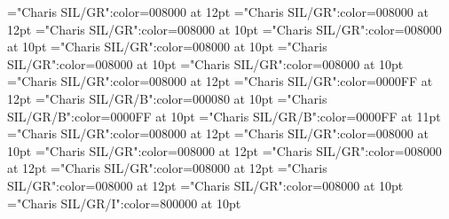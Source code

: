 \documentclass[a4paper,twoside]{article}
\begin{document}
\font\translationcontenttranslationcontentsexamplescontentexamplescontentssensesensecontentsensesentryletDatadicBody="Charis SIL/GR":color=008000 at 12pt
\font\translationtranslationcontenttranslationcontentsexamplescontentexamplescontentssensesensecontentsensesentryletDatadicBody="Charis SIL/GR":color=008000 at 12pt
\font\spanestranslationtranslationcontenttranslationcontentsexamplescontentexamplescontentssensesensecontentsensesentryletDatadicBody="Charis SIL/GR":color=008000 at 10pt
\font\spanspanestranslationtranslationcontenttranslationcontentsexamplescontentexamplescontentssensesensecontentsensesentryletDatadicBody="Charis SIL/GR":color=008000 at 10pt
\font\spantranslationtranslationcontenttranslationcontentsexamplescontentexamplescontentssensesensecontentsensesentryletDatadicBody="Charis SIL/GR":color=008000 at 10pt
\font\spanesspanestranslationtranslationcontenttranslationcontentsexamplescontentexamplescontentssensesensecontentsensesentryletDatadicBody="Charis SIL/GR":color=008000 at 10pt
\font\translationstesspanestranslationtranslationcontenttranslationcontentsexamplescontentexamplescontentssensesensecontentsensesentryletDatadicBody="Charis SIL/GR":color=008000 at 10pt
\font\minorentryvariantletDatadicBody="Charis SIL/GR":color=008000 at 12pt
\font\headwordminorentryvariantletDatadicBody="Charis SIL/GR":color=0000FF at 12pt
\font\spanmxbheadwordminorentryvariantletDatadicBody="Charis SIL/GR/B":color=000080 at 10pt
\font\aspanmxbheadwordminorentryvariantletDatadicBody="Charis SIL/GR/B":color=0000FF at 10pt
\font\spanheadwordminorentryvariantletDatadicBody="Charis SIL/GR/B":color=0000FF at 11pt
\font\visiblevariantentryrefsminorentryvariantletDatadicBody="Charis SIL/GR":color=008000 at 12pt
\font\spanvisiblevariantentryrefsminorentryvariantletDatadicBody="Charis SIL/GR":color=008000 at 10pt
\font\visiblevariantentryrefvisiblevariantentryrefsminorentryvariantletDatadicBody="Charis SIL/GR":color=008000 at 12pt
\font\variantentrytypesvisiblevariantentryrefvisiblevariantentryrefsminorentryvariantletDatadicBody="Charis SIL/GR":color=008000 at 12pt
\font\variantentrytypevariantentrytypesvisiblevariantentryrefvisiblevariantentryrefsminorentryvariantletDatadicBody="Charis SIL/GR":color=008000 at 12pt
\font\reverseabbrvariantentrytypevariantentrytypesvisiblevariantentryrefvisiblevariantentryrefsminorentryvariantletDatadicBody="Charis SIL/GR":color=008000 at 12pt
\font\spanesreverseabbrvariantentrytypevariantentrytypesvisiblevariantentryrefvisiblevariantentryrefsminorentryvariantletDatadicBody="Charis SIL/GR":color=008000 at 10pt
\font\spanreverseabbrvariantentrytypevariantentrytypesvisiblevariantentryrefvisiblevariantentryrefsminorentryvariantletDatadicBody="Charis SIL/GR/I":color=800000 at 10pt
\end{document}
